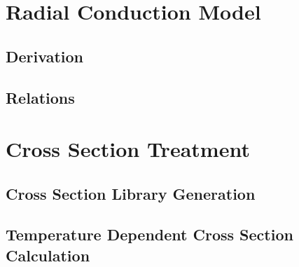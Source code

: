 \section{Radial Conduction Model}
  \label{sec:radial_conduction_model}
  \subsection{Derivation}
  \subsection{Relations}
\section{Cross Section Treatment}
  \subsection{Cross Section Library Generation}
  \subsection{Temperature Dependent Cross Section Calculation}

